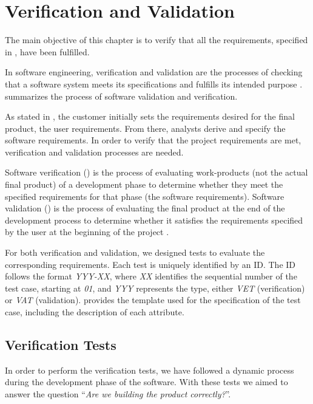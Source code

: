 \chapter{Verification and Validation}\label{chap:validation}
The main objective of this chapter is to verify that all the requirements, specified in , have been fulfilled.

In software engineering, verification and validation are the processes of checking that a software system meets its specifications and fulfills its intended purpose \parencite{IEEE1012-2012}.  summarizes the process of software validation and verification.


As stated in , the customer initially sets the requirements desired for the final product, the user requirements. From there, analysts derive and specify the software requirements. In order to verify that the project requirements are met, verification and validation processes are needed.

Software verification () is the process of evaluating work-products (not the actual final product) of a development phase to determine whether they meet the specified requirements for that phase (the software requirements). Software validation () is the process of evaluating the final product at the end of the development process to determine whether it satisfies the requirements specified by the user at the beginning of the project \parencite{IEEE1012-2012}.

For both verification and validation, we designed tests to evaluate the corresponding requirements. Each test is uniquely identified by an ID. The ID follows the format \textit{YYY-XX}, where \textit{XX} identifies the sequential number of the test case, starting at \textit{01}, and \textit{YYY} represents the type, either \textit{VET} (verification) or \textit{VAT} (validation).  provides the template used for the specification of the test case, including the description of each attribute.




\section{Verification Tests}\label{sec:verification}
In order to perform the verification tests, we have followed a dynamic process during the development phase of the software. With these tests we aimed to answer the question ``\textit{Are we building the product correctly?}''.

